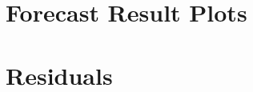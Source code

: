 \documentclass[hidelinks, a4paper,12pt]{article}
\begin{document}

\tableofcontents
\newpage








\newpage
\appendix

\section{Forecast Result Plots}
\label{sec:forecast results}

\section{Residuals}
\label{sec:residuals}


\clearpage
{}
{}


\end{document}
